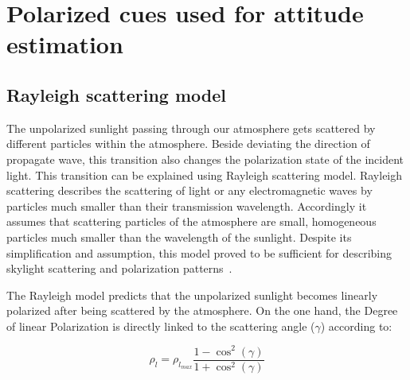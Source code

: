 \graphicspath{{./content/intro/figures/}}

\section{Polarized cues used for attitude estimation}
\label{sec:pcues}


\subsection{Rayleigh scattering model}
\label{subsec:rayleigh}
The unpolarized sunlight passing through our atmosphere gets scattered by
different particles within the atmosphere.  Beside deviating the direction of
propagate wave, this transition also changes the polarization state of the
incident light. This transition can be explained using Rayleigh scattering
model.  Rayleigh scattering describes the scattering of light or any
electromagnetic waves by particles much smaller than their transmission
wavelength. Accordingly it assumes that scattering particles of the atmosphere
are small, homogeneous particles much smaller than the wavelength of the
sunlight.  Despite its simplification and assumption, this model proved to be
sufficient for describing skylight scattering and polarization
patterns~\cite{pomozi2001clearsky, horvath2002ground}.

The Rayleigh model predicts that the unpolarized sunlight becomes
linearly polarized after being scattered by the atmosphere. On the one hand, the Degree of linear
Polarization is directly linked to the scattering angle ($\gamma$) according to:

\begin{equation}
  \label{eq:3}
  \rho_{l} = \rho_{l_{max}}\frac{1 - \cos^{2}(\gamma)}{1 + \cos^{
      2}(\gamma)}
\end{equation}

